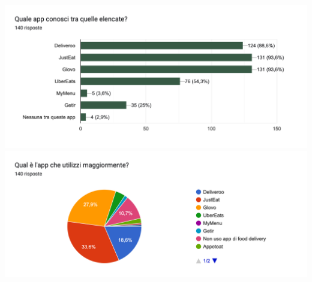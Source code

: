 \documentclass{article}
\begin{document}
\begin{center}
    \includegraphics[width=\textwidth]{Data/Grafici/App_competitor.png} 
    \includegraphics[width=\textwidth]{Data/Grafici/App_competitor_utilizzate.png}
\end{center}



    \vspace{1cm}
\end{document}
